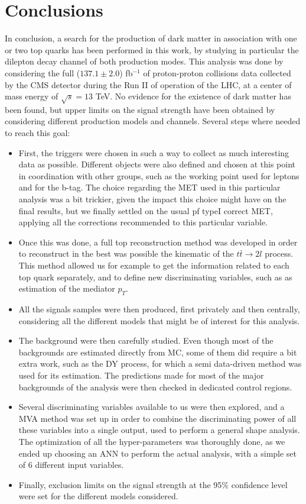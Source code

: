 \documentclass[a4paper, 10pt, openright]{report}
\begin{document}
\chapter{Conclusions} \label{chapter:Conclusion}

In conclusion, a search for the production of dark matter in association with one or two top quarks has been performed in this work, by studying in particular the dilepton decay channel of both production modes. This analysis was done by considering the full ($137.1 \pm 2.0$) fb$^{-1}$ of proton-proton collisions data collected by the \ac{CMS} detector during the Run II of operation of the \ac{LHC}, at a center of mass energy of $\sqrt{s} = 13$ TeV. No evidence for the existence of dark matter has been found, but upper limits on the signal strength have been obtained by considering different production models and channels.  Several steps where needed to reach this goal:

\begin{itemize}
\item First, the triggers were chosen in such a way to collect as much interesting data as possible. Different objects were also defined and chosen at this point in coordination with other groups, such as the working point used for leptons and for the b-tag. The choice regarding the \ac{MET} used in this particular analysis was a bit trickier, given the impact this choice might have on the final results, but we finally settled on the usual pf typeI correct \ac{MET}, applying all the corrections recommended to this particular variable.
\item Once this was done, a full top reconstruction method was developed in order to reconstruct in the best was possible the kinematic of the $t \bar t \rightarrow 2l$ process. This method allowed us for example to get the information related to each top quark separately, and to define new discriminating variables, such as as estimation of the mediator \bm $p_T$.
\item All the signals samples were then produced, first privately and then centrally, considering all the different models that might be of interest for this analysis.
\item The background were then carefully studied. Even though most of the backgrounds are estimated directly from \ac{MC}, some of them did require a bit extra work, such as the \ac{DY} process, for which a semi data-driven method was used for its estimation. The predictions made for most of the major backgrounds of the analysis were then checked in dedicated control regions.
\item Several discriminating variables available to us were then explored, and a MVA method was set up in order to combine the discriminating power of all these variables into a single output, used to perform a general shape analysis. The optimization of all the hyper-parameters was thoroughly done, as we ended up choosing an \ac{ANN} to perform the actual analysis, with a simple set of 6 different input variables.
\item Finally, exclusion limits on the signal strength at the 95\% confidence level were set for the different models considered.
\end{itemize}
\end{document}
